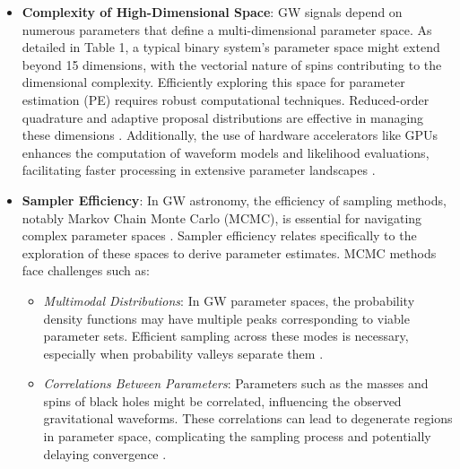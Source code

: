 \documentclass[12pt]{article}
\begin{document}
\begin{itemize}


\item \textbf{Complexity of High-Dimensional Space}: GW signals depend on numerous parameters that define a multi-dimensional parameter space. As detailed in Table 1, a typical binary system's parameter space might extend beyond 15 dimensions, with the vectorial nature of spins contributing to the dimensional complexity. Efficiently exploring this space for parameter estimation (PE) requires robust computational techniques. Reduced-order quadrature and adaptive proposal distributions are effective in managing these dimensions \cite{Smith2016}. Additionally, the use of hardware accelerators like GPUs enhances the computation of waveform models and likelihood evaluations, facilitating faster processing in extensive parameter landscapes \cite{Wong2023}.






\item \textbf{Sampler Efficiency}: In GW astronomy, the efficiency of sampling methods, notably Markov Chain Monte Carlo (MCMC), is essential for navigating complex parameter spaces \cite{LISA-MCMC}. Sampler efficiency relates specifically to the exploration of these spaces to derive parameter estimates. MCMC methods face challenges such as:
    \begin{itemize}
        \item \textit{Multimodal Distributions}: In GW parameter spaces, the probability density functions may have multiple peaks corresponding to viable parameter sets. Efficient sampling across these modes is necessary, especially when probability valleys separate them \cite{Roulet2022}.
        \item \textit{Correlations Between Parameters}: Parameters such as the masses and spins of black holes might be correlated, influencing the observed gravitational waveforms. These correlations can lead to degenerate regions in parameter space, complicating the sampling process and potentially delaying convergence \cite{Luengo2020, Kramer2014}.
    \end{itemize}





\end{itemize}
\end{document}
